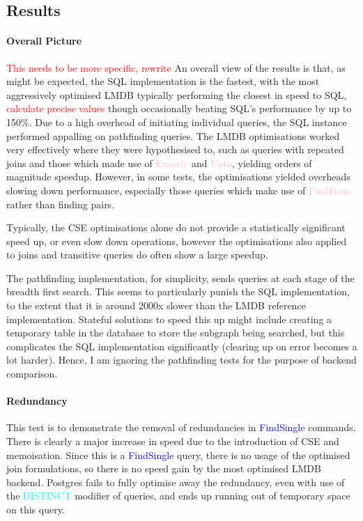 \documentclass[12pt,a4paper,twoside,openright]{report}
\newcommand\todo[1]{\textcolor{red}{#1}}
\newcommand\codeName[1]{\textcolor{blue}{#1}}
\newcommand\note[1]{\textcolor{cyan}{#1}}
\newcommand\mathName[1]{\textcolor{pink}{#1}}
\begin{document}
{{	\subsection{Results}
		\paragraph{Overall Picture}
		\todo{This needs to be more specific, rewrite}
		An overall view of the results is that, as might be expected, the SQL implementation is the fastest, with the most aggressively optimised LMDB typically performing the closest in speed to SQL, \todo{calculate precise values} though occasionally beating SQL's performance by up to 150\%. Due to a high overhead of initiating individual queries, the SQL instance performed appalling on pathfinding queries. The LMDB optimisations worked very effectively where they were hypothesised to, such as queries with repeated joins and those which made use of \mathName{Exactly} and \mathName{Upto}, yielding orders of magnitude speedup. However, in some tests, the optimisations yielded overheads slowing down performance, especially those queries which make use of \mathName{FindFrom} rather than finding pairs.

Typically, the CSE optimisations alone do not provide a statistically significant speed up, or even slow down operations, however the optimisations also applied to joins and transitive queries do often show a large speedup. 

		The pathfinding implementation, for simplicity, sends queries at each stage of the breadth first search. This seems to particularly punish the SQL implementation, to the extent that it is around 2000x slower than the LMDB reference implementation. Stateful solutions to speed this up might include creating a temporary table in the database to store the subgraph being searched, but this complicates the SQL implementation significantly (clearing up on error becomes a lot harder). Hence, I am ignoring the pathfinding tests for the purpose of backend comparison.


		\paragraph{Redundancy}
			This test is to demonstrate the removal of redundancies in \codeName{FindSingle} commands. There is clearly a major increase in speed due to the introduction of CSE and memoisation. Since this is a \codeName{FindSingle} query, there is no usage of the optimised join formulations, so there is no speed gain by the most optimised LMDB backend. Postgres fails to fully optimise away the redundancy, even with use of the \note{DISTINCT} modifier of queries, and ends up running out of temporary space on this query.
			
}}
\end{document}
